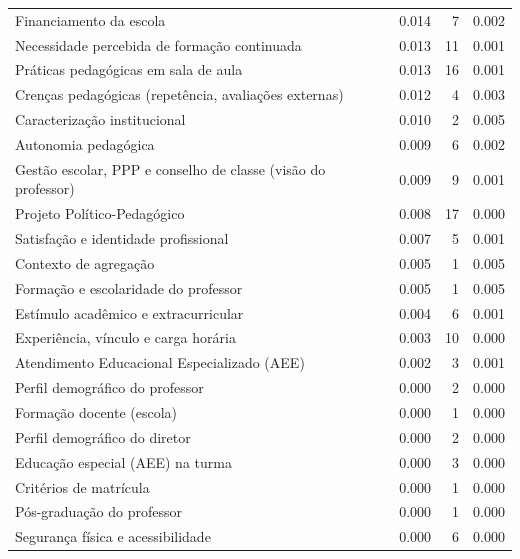 \begin{tabular}{lrrr}
Financiamento da escola & 0.014 & 7 & 0.002 \\
Necessidade percebida de formação continuada & 0.013 & 11 & 0.001 \\
Práticas pedagógicas em sala de aula & 0.013 & 16 & 0.001 \\
Crenças pedagógicas (repetência, avaliações externas) & 0.012 & 4 & 0.003 \\
Caracterização institucional & 0.010 & 2 & 0.005 \\
Autonomia pedagógica & 0.009 & 6 & 0.002 \\
Gestão escolar, PPP e conselho de classe (visão do professor) & 0.009 & 9 & 0.001 \\
Projeto Político-Pedagógico & 0.008 & 17 & 0.000 \\
Satisfação e identidade profissional & 0.007 & 5 & 0.001 \\
Contexto de agregação & 0.005 & 1 & 0.005 \\
Formação e escolaridade do professor & 0.005 & 1 & 0.005 \\
Estímulo acadêmico e extracurricular & 0.004 & 6 & 0.001 \\
Experiência, vínculo e carga horária & 0.003 & 10 & 0.000 \\
Atendimento Educacional Especializado (AEE) & 0.002 & 3 & 0.001 \\
Perfil demográfico do professor & 0.000 & 2 & 0.000 \\
Formação docente (escola) & 0.000 & 1 & 0.000 \\
Perfil demográfico do diretor & 0.000 & 2 & 0.000 \\
Educação especial (AEE) na turma & 0.000 & 3 & 0.000 \\
Critérios de matrícula & 0.000 & 1 & 0.000 \\
Pós-graduação do professor & 0.000 & 1 & 0.000 \\
Segurança física e acessibilidade & 0.000 & 6 & 0.000 \\
\bottomrule
\end{tabular}
